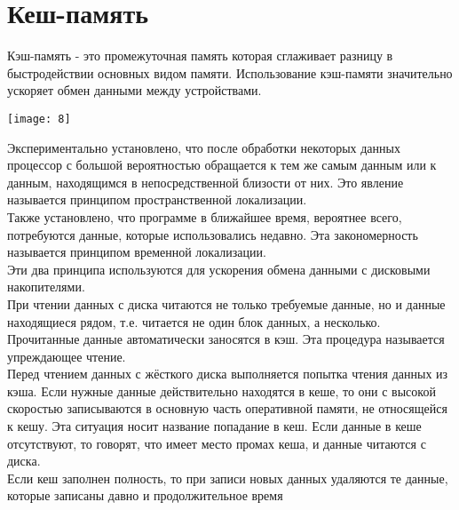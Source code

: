\documentclass[a4paper]{article}
\begin{document}
\section*{Кеш-память}
\setcounter{subsection}{0}
Кэш-память - это промежуточная память которая сглаживает разницу в быстродействии основных видом памяти. Использование кэш-памяти значительно ускоряет обмен данными между устройствами.\\
\begin{center}
	\texttt{[image: 8]}
\end{center}
Экспериментально установлено, что после обработки некоторых данных процессор с большой вероятностью обращается к тем же самым данным или к данным, находящимся в непосредственной близости от них. Это явление называется принципом пространственной локализации.\\
Также установлено, что программе в ближайшее время, вероятнее всего, потребуются данные, которые использовались недавно. Эта закономерность называется принципом временной локализации.\\
Эти два принципа используются для ускорения обмена данными с дисковыми накопителями.\\
При чтении данных с диска читаются не только требуемые данные, но и данные находящиеся рядом, т.е. читается не один блок данных, а несколько. Прочитанные данные автоматически заносятся в кэш. Эта процедура называется упреждающее чтение.\\
Перед чтением данных с жёсткого диска выполняется попытка чтения данных из кэша. Если нужные данные действительно находятся в кеше, то они с высокой скоростью записываются в основную часть оперативной памяти, не относящейся к кешу. Эта ситуация носит название попадание в кеш. Если данные в кеше отсутствуют, то говорят, что имеет место промах кеша, и данные читаются с диска.\\
Если кеш заполнен полность, то при записи новых данных удаляются те данные, которые записаны давно и продолжительное время
\end{document}
